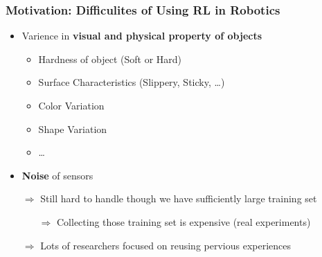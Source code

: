 \documentclass{beamer}
\newcommand{\firstSec}{Motivation}
\begin{document}
    \begin{frame}
      \frametitle{\firstSec : Difficulites of Using RL in Robotics}
      \begin{itemize}
        \item Varience in \textbf{visual and physical property of objects}
        \pause
        \begin{itemize}
          \item Hardness of object (Soft or Hard)
          \item Surface Characteristics (Slippery, Sticky, \ldots)
          \item Color Variation
          \item Shape Variation
          \item \ldots
        \end{itemize}
        \pause
        \item \textbf{Noise} of sensors
      \end{itemize}
      \pause
      \begin{itemize}
        \setlength{\itemindent}{.3in}
        \item[$\Rightarrow$] Still hard to handle though we have sufficiently large training set
        \begin{itemize}
          \setlength{\itemindent}{0.3in}
          \item[$\Rightarrow$] Collecting those training set is expensive (real experiments) 
        \end{itemize}
        \pause
        \item[$\Rightarrow$] Lots of researchers focused on reusing pervious experiences
      \end{itemize} 
    \end{frame}
\end{document}
